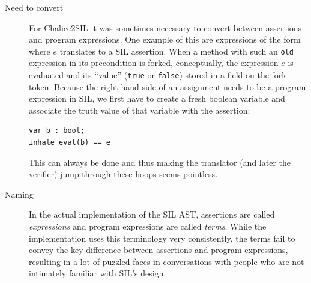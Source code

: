 \begin{description}
\item[Need to convert]
For Chalice2SIL it was sometimes necessary to convert between assertions and program expressions.
One example of this are expressions of the form  where $e$ translates to a SIL assertion. 
When a method with such an \lstinline[language=SIL]!old! expression in its precondition is forked, conceptually, the expression $e$ is evaluated and its ``value'' (\lstinline[language=Chalice]!true! or \lstinline[language=Chalice]!false!) stored in a field on the fork-token.
Because the right-hand side of an assignment needs to be a program expression in SIL, we first have to create a fresh boolean variable  and associate the truth value of that variable with the assertion:
\begin{lstlisting}[language=SIL]
var b : bool;
inhale eval(b) == e
\end{lstlisting}

This can always be done and thus making the translator (and later the verifier) jump through these hoops seems pointless.

\item[Naming]
In the actual implementation of the SIL AST, assertions are called \emph{expressions} and program expressions are called \emph{terms}. 
While the implementation uses this terminology very consistently, the terms fail to convey the key difference between assertions and program expressions, resulting in a lot of puzzled faces in conversations with people who are not intimately familiar with SIL's design.
\end{description}

